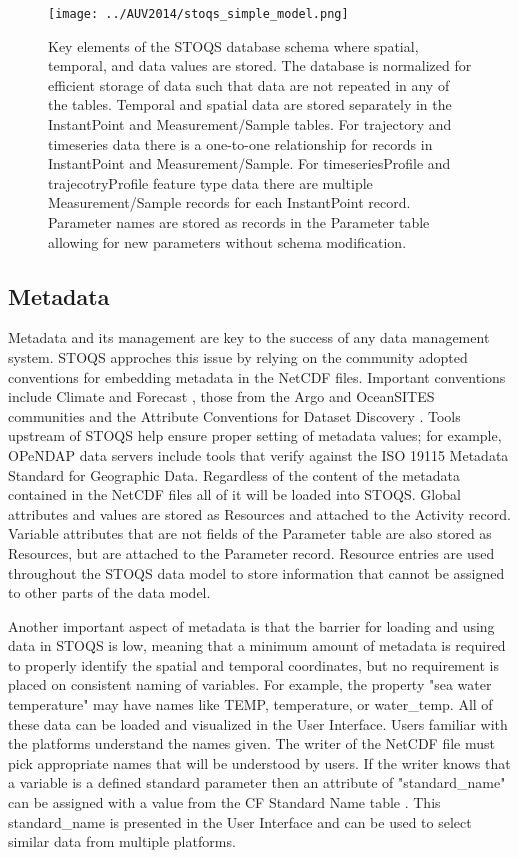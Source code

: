 \documentclass[conference]{IEEEtran}
\begin{document}
\begin{figure}[htbp]
\centering
\texttt{[image: ../AUV2014/stoqs\_simple\_model.png]}
\caption{Key elements of the STOQS database schema where spatial, temporal, and data 
values are stored. The database is normalized for efficient storage of data such 
that data are not repeated in any of the tables. Temporal and spatial data are stored 
separately in the InstantPoint and Measurement/Sample tables. For trajectory and 
timeseries data there is a one-to-one relationship for records in InstantPoint and 
Measurement/Sample. For timeseriesProfile and trajecotryProfile feature type data 
there are multiple Measurement/Sample records for each InstantPoint record. 
Parameter names are stored as records in the Parameter table allowing for new 
parameters without schema modification.}
\label{fig:stoqs_simple_model}
\end{figure}

\subsection{Metadata}

Metadata and its management are key to the success of any data management system. 
STOQS approches this issue by relying on the community adopted conventions for 
embedding metadata in the NetCDF files. Important conventions include Climate and 
Forecast \cite{CF}, those from the Argo and OceanSITES communities \cite{Pouliquen2006} 
and the Attribute Conventions for Dataset Discovery \cite{ACDD}. Tools upstream 
of STOQS help ensure proper setting of metadata values; for example, OPeNDAP data 
servers include tools that verify against the ISO 19115 Metadata Standard for 
Geographic Data. Regardless of the content of the metadata contained in the NetCDF 
files all of it will be loaded into STOQS. Global attributes and values are stored 
as Resources and attached to the Activity record. Variable attributes that are not 
fields of the Parameter table are also stored as Resources, but are attached to the 
Parameter record. Resource entries are used throughout the STOQS data model to store 
information that cannot be assigned to other parts of the data model.

Another important aspect of metadata is that the barrier for loading and using data in 
STOQS is low, meaning that a minimum amount of metadata is required to properly 
identify the spatial and temporal coordinates, but no requirement is placed on 
consistent naming of variables. For example, the property "sea water temperature" may 
have names like TEMP, temperature, or water\_temp. All of these data can be loaded and 
visualized in the User Interface. Users familiar with the platforms understand the names 
given. The writer of the NetCDF file must pick appropriate names that will be understood 
by users. If the writer knows that a variable is a defined standard parameter then an 
attribute of "standard\_name" can be assigned with a value from the CF Standard Name 
table \cite{CFSN}. This standard\_name is presented in the User Interface and can be 
used to select similar data from multiple platforms.
\end{document}
